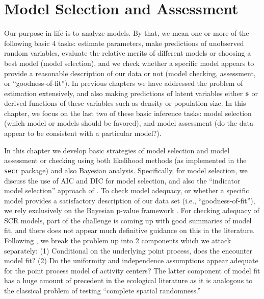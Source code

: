 \chapter{
Model Selection and Assessment
}
\label{chapt.gof}

\vspace{.3in}

Our purpose in life is to analyze models. By that, we mean one or more
of the following basic 4 tasks: estimate parameters, make predictions
of unobserved random variables, evaluate the
relative merits of different models or choosing a best model (model
selection), and we check whether a specific model appears to provide a
reasonable description of our data or not (model checking, assessment,
or ``goodness-of-fit'').  In previous
chapters we have addressed the problem of estimation extensively, and
also making predictions of latent variables either ${\bf s}$ or
derived functions of these variables such as density or population
size.  In this chapter, we focus on the last two of these basic
inference tasks: model selection (which model or models should be
favored), and model assessment (do the data appear to be consistent
with a particular model?).


In this chapter we develop basic strategies of model selection and
model assessment or checking using both likelihood methods (as
implemented in the \mbox{\tt secr} package) and also Bayesian
analysis.  
Specifically, for model selection, we discuss the use of AIC and DIC for model
selection, and also the ``indicator model selection'' approach of
\citet{kuo_mallick:1998}.  To check model adequacy, or whether a
specific model provides a satisfactory description of our data set
(i.e., ``goodness-of-fit''), we rely exclusively on the Bayesian
p-value framework \citep{gelman_etal:2006}.  For checking adequacy of
SCR models, part of the challenge is coming up with good summaries of
model fit, and there does not appear much definitive guidance on this
in the literature.  Following \citet{royle_etal:2011mee}, we break the
problem up into 2 components which we attack separately: (1)
Conditional on the underlying point process, does the encounter model
fit? (2) Do the uniformity and independence assumptions appear
adequate for the point process model of activity centers? The latter
component of model fit has a huge amount of precedent in the
ecological literature as it is analogous to the classical problem of
testing ``complete spatial randomness.''

